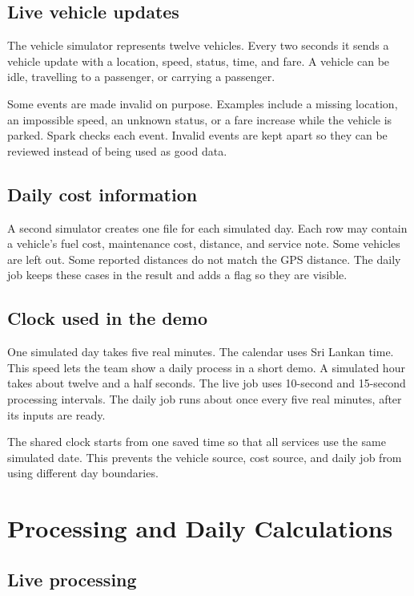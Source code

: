 \documentclass[11pt,a4paper]{article}
\begin{document}
\subsection{Live vehicle updates}

The vehicle simulator represents twelve vehicles. Every two seconds it sends a vehicle update with
a location, speed, status, time, and fare. A vehicle can be idle, travelling to a passenger, or
carrying a passenger.

Some events are made invalid on purpose. Examples include a missing location, an impossible speed,
an unknown status, or a fare increase while the vehicle is parked. Spark checks each event. Invalid
events are kept apart so they can be reviewed instead of being used as good data.

\subsection{Daily cost information}

A second simulator creates one file for each simulated day. Each row may contain a vehicle's fuel
cost, maintenance cost, distance, and service note. Some vehicles are left out. Some reported
distances do not match the GPS distance. The daily job keeps these cases in the result and adds a
flag so they are visible.

\subsection{Clock used in the demo}

One simulated day takes five real minutes. The calendar uses Sri Lankan time. This speed lets the
team show a daily process in a short demo. A simulated hour takes about twelve and a half seconds.
The live job uses 10-second and 15-second processing intervals. The daily job runs about once every
five real minutes, after its inputs are ready.

The shared clock starts from one saved time so that all services use the same simulated date. This
prevents the vehicle source, cost source, and daily job from using different day boundaries.

\section{Processing and Daily Calculations}

\subsection{Live processing}
\end{document}
